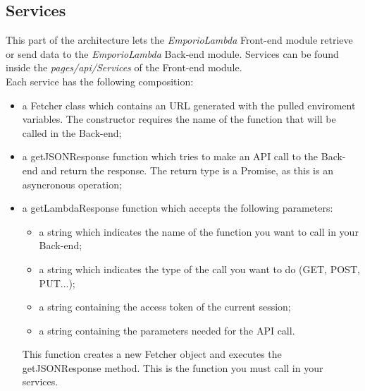 \subsection{Services}
This part of the architecture lets the \textit{EmporioLambda} Front-end module retrieve or send data to the \textit{EmporioLambda} Back-end module. Services can be found inside the \textit{pages/api/Services} of the Front-end module.\\
Each service has the following composition:
\begin{itemize}
\item a Fetcher class which contains an URL generated with the pulled enviroment variables. The constructor requires the name of the function that will be called in the Back-end;
\item a getJSONResponse function which tries to make an API call to the Back-end and return the response. The return type is a Promise, as this is an asyncronous operation;
\item a getLambdaResponse function which accepts the following parameters:\begin{itemize}
\item a string which indicates the name of the function you want to call in your Back-end; 
\item a string which indicates the type of the call you want to do (GET, POST, PUT...);
\item a string containing the access token of the current session; 
\item a string containing the parameters needed for the API call. 
\end{itemize} 
This function creates a new Fetcher object and executes the getJSONResponse method. This is the function you must call in your services.
\end{itemize}
